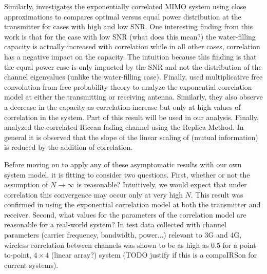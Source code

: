 Similarly, \cite{chuah2002capacity} investigates the exponentially correlated MIMO system using close approximations to compares optimal versus equal power distribution at the transmitter for cases with high and low SNR. One interesting finding from this work is that for the case with low
SNR (what does this mean?) the water-filling capacity is actually increased with correlation while in all other cases, correlation has a negative impact on the capacity. The intuition because this finding is that the equal power case is only impacted by the SNR and not the distribution of the channel eigenvalues (unlike the water-filling case).
Finally, \cite{skupch2005free} used multiplicative free convolution from free probability theory to analyze the exponential correlation model at either the transmitting or receiving antenna. Similarly, they also observe a decrease in the capacity as correlation increase but only at high values of correlation in the system. Part of this result will be used in our analysis. 
Finally,
\cite{taricco2008asymptotic} analyzed the correlated Ricean fading channel using the Replica Method. 
In general it is observed that the slope of the linear scaling of (mutual information) is reduced by the addition of correlation. 
\par
Before moving on to apply any of these asymptomatic results with our own system model, it is fitting to consider two questions. 
First, whether or not the assumption of  $N \rightarrow \infty$ is reasonable? Intuitively, we would expect that under correlation this convergence may occur only at very high $N$. This result was confirmed in  \cite{martin2004asymptotic} using the exponential correlation model at both the transmitter and receiver. 
Second, what values for the parameters of the correlation model are reasonable for a real-world system?
In test data collected with channel parameters (carrier frequency, bandwidth, power...) relevant to 3G and 4G, wireless correlation between channels was shown to be as high as $0.5$ for a point-to-point, $4 \times 4$ (linear array?) system \cite{martin2000multiple} (TODO justify if this is a compaIRSon for current systems).